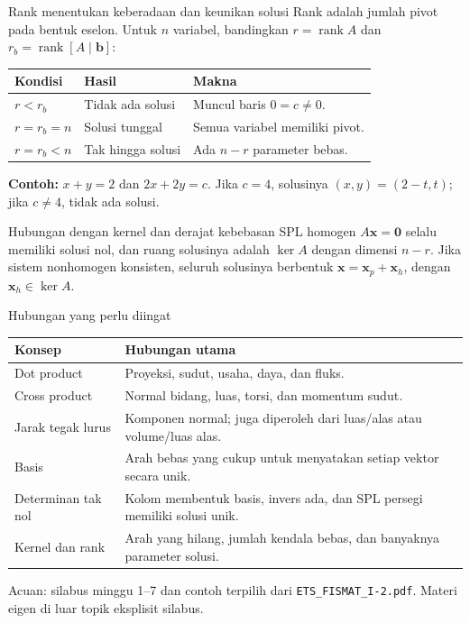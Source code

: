 \documentclass[11pt,aspectratio=169]{beamer}
\newcommand{\vect}[1]{\boldsymbol{#1}}
\DeclareMathOperator{\rank}{rank}
\begin{document}
\begin{frame}{Rank menentukan keberadaan dan keunikan solusi}
\small
Rank adalah jumlah pivot pada bentuk eselon. Untuk $n$ variabel, bandingkan
$r=\rank A$ dan $r_b=\rank[A\mid\vect{b}]$:
\begin{center}
\renewcommand{\arraystretch}{1.2}
\begin{tabular}{@{}lll@{}}
\toprule
\textbf{Kondisi} & \textbf{Hasil} & \textbf{Makna}\\
\midrule
$r<r_b$ & Tidak ada solusi & Muncul baris $0=c\ne0$.\\
$r=r_b=n$ & Solusi tunggal & Semua variabel memiliki pivot.\\
$r=r_b<n$ & Tak hingga solusi & Ada $n-r$ parameter bebas.\\
\bottomrule
\end{tabular}
\end{center}
\textbf{Contoh:} $x+y=2$ dan $2x+2y=c$.
Jika $c=4$, solusinya $(x,y)=(2-t,t)$; jika $c\ne4$, tidak ada solusi.
\begin{block}{Hubungan dengan kernel dan derajat kebebasan}
SPL homogen $A\vect{x}=\vect{0}$ selalu memiliki solusi nol,
dan ruang solusinya adalah $\ker A$ dengan dimensi $n-r$.
Jika sistem nonhomogen konsisten, seluruh solusinya berbentuk
$\vect{x}=\vect{x}_p+\vect{x}_h$, dengan $\vect{x}_h\in\ker A$.
\end{block}
\end{frame}

\begin{frame}{Hubungan yang perlu diingat}
\small
\renewcommand{\arraystretch}{1.3}
\begin{tabular}{@{}>{\raggedright\arraybackslash}p{}>{\raggedright\arraybackslash}p{}@{}}
\toprule
\textbf{Konsep} & \textbf{Hubungan utama}\\
\midrule
Dot product & Proyeksi, sudut, usaha, daya, dan fluks.\\
Cross product & Normal bidang, luas, torsi, dan momentum sudut.\\
Jarak tegak lurus & Komponen normal; juga diperoleh dari luas/alas atau volume/luas alas.\\
Basis & Arah bebas yang cukup untuk menyatakan setiap vektor secara unik.\\
Determinan tak nol & Kolom membentuk basis, invers ada, dan SPL persegi memiliki solusi unik.\\
Kernel dan rank & Arah yang hilang, jumlah kendala bebas, dan banyaknya parameter solusi.\\
\bottomrule
\end{tabular}
\vfill
{\scriptsize\color{Muted}Acuan: silabus minggu 1--7 dan contoh terpilih dari
\texttt{ETS\_FISMAT\_I-2.pdf}. Materi eigen di luar topik eksplisit silabus.}
\end{frame}
\end{document}
